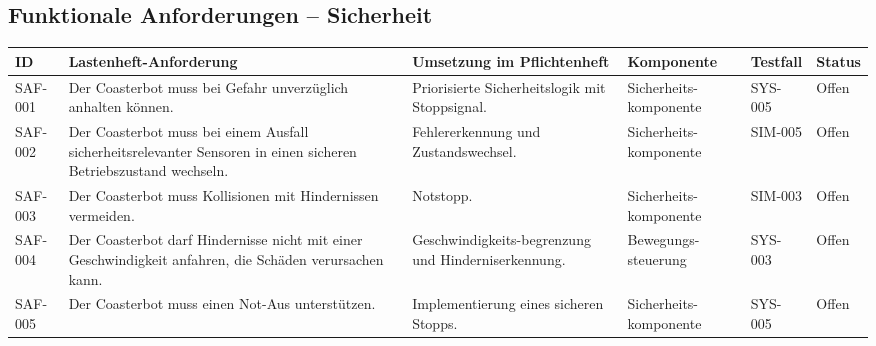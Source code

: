 \documentclass[
  a4paper,
  12pt,
  DIV=12,        %
  parskip=half,  %
  headings=small %
]{scrartcl}
\theoremstyle{definition}
\theoremstyle{definition}
\begin{document}
\subsection{Funktionale Anforderungen --
Sicherheit}\label{funktionale-anforderungen-sicherheit}

\begin{longtable}[]{@{}
  >{\raggedright\arraybackslash}p{}
  >{\raggedright\arraybackslash}p{}
  >{\raggedright\arraybackslash}p{}
  >{\raggedright\arraybackslash}p{}
  >{\raggedleft\arraybackslash}p{}
  >{\raggedright\arraybackslash}p{}@{}}
\toprule\noalign{}
\begin{minipage}[b]{\linewidth}\raggedright
ID
\end{minipage} & \begin{minipage}[b]{\linewidth}\raggedright
Lastenheft-Anforderung
\end{minipage} & \begin{minipage}[b]{\linewidth}\raggedright
Umsetzung im Pflichtenheft
\end{minipage} & \begin{minipage}[b]{\linewidth}\raggedright
Komponente
\end{minipage} & \begin{minipage}[b]{\linewidth}\raggedleft
Testfall
\end{minipage} & \begin{minipage}[b]{\linewidth}\raggedright
Status
\end{minipage} \\
\midrule\noalign{}
\endhead
\bottomrule\noalign{}
\endlastfoot
SAF-001 & Der Coasterbot muss bei Gefahr unverzüglich anhalten können. &
Priorisierte Sicherheitslogik mit Stoppsignal. & Sicherheits-komponente
& SYS-005 & Offen \\
SAF-002 & Der Coasterbot muss bei einem Ausfall sicherheitsrelevanter
Sensoren in einen sicheren Betriebszustand wechseln. & Fehlererkennung
und Zustandswechsel. & Sicherheits-komponente & SIM-005 & Offen \\
SAF-003 & Der Coasterbot muss Kollisionen mit Hindernissen vermeiden. &
Notstopp. & Sicherheits-komponente & SIM-003 & Offen \\
SAF-004 & Der Coasterbot darf Hindernisse nicht mit einer
Geschwindigkeit anfahren, die Schäden verursachen kann. &
Geschwindigkeits-begrenzung und Hinderniserkennung. &
Bewegungs-steuerung & SYS-003 & Offen \\
SAF-005 & Der Coasterbot muss einen Not-Aus unterstützen. &
Implementierung eines sicheren Stopps. & Sicherheits-komponente &
SYS-005 & Offen \\
\end{longtable}
\end{document}
